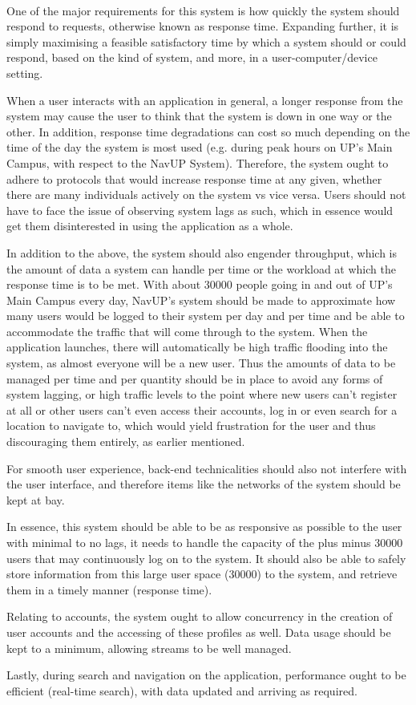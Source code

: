 
	\mbox{}\\
	One of the major requirements for this system is how quickly the system should respond to requests, 
	otherwise known as response time. Expanding further, it is simply maximising a feasible satisfactory
	time by which a system should or could respond, based on the kind of system, and more, in a 
	user-computer/device setting. 

	When a user interacts with an application in general, a longer response from the system may cause 
	the user to think that the system is down in one way or the other. In addition, response time degradations 
	can cost so much depending on the time of the day the system is most used (e.g. during peak hours on UP’s 
	Main Campus, with respect to the NavUP System). 
	Therefore, the system ought to adhere to protocols that would increase response time at any given,
	whether there are many individuals actively on the system vs vice versa. Users should not have to 
	face the issue of observing system lags as such, which in essence would get them disinterested in
	using the application as a whole. 

	In addition to the above, the system should also engender throughput, which is the amount of data 
	a system can handle per time or the workload at which the response time is to be met. With about 
	30000 people going in and out of UP’s Main Campus every day, NavUP’s system should be made to approximate 
	how many users would  be logged to their system per day and per time and be able to accommodate the 
	traffic that will come through to the system. 
	When the application launches, there will automatically be high traffic flooding into the system, 
	as almost everyone will be a new user. Thus the amounts of data to be managed per time and per quantity 
	should be in place to avoid any forms of system lagging, or high traffic levels to the point where new users 
	can’t register at all or other users can’t even access their accounts, log in or even search for a location
	to navigate to, which would yield frustration for the user and thus discouraging them entirely,
	as earlier mentioned. 

	For smooth user experience, back-end technicalities should also not interfere with the user interface,
	and therefore items like the networks of the system should be kept at bay.

	In essence, this system should be able to be as responsive as possible to the user with minimal to 
	no lags, it needs to handle the capacity of the plus minus 30000 users that may continuously log on 
	to the system. It should also be able to safely store information from this large user space (30000) to 
	the system, and retrieve them in a timely manner (response time).

	Relating to accounts, the system ought to allow concurrency in the creation of user accounts and the
	accessing of these profiles as well. Data usage should be kept to a minimum, allowing streams to be 
	well managed. 

	Lastly, during search and navigation on the application, performance ought to be efficient (real-time search), 
	with data updated and arriving as required.

